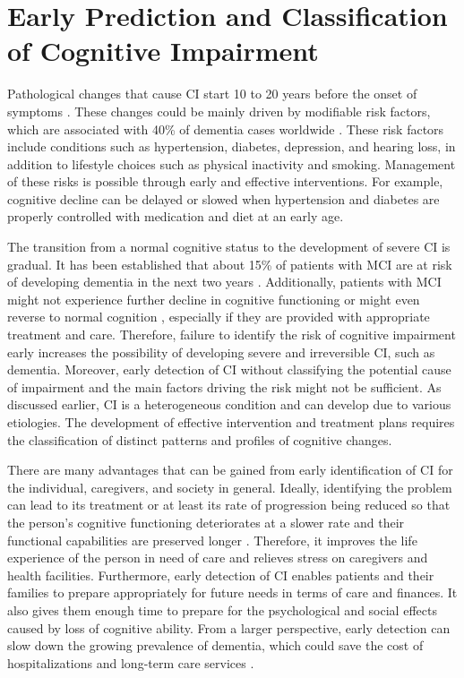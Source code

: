 \section{Early Prediction and Classification of Cognitive Impairment}
Pathological changes that cause CI start 10 to 20 years before the onset of symptoms \cite{Beason-Held2013Changes}. These changes could be mainly driven by modifiable risk factors, which are associated with 40\% of dementia cases worldwide \cite{Livingston2020Dementia}. These risk factors include conditions such as hypertension, diabetes, depression, and hearing loss, in addition to lifestyle choices such as physical inactivity and smoking. Management of these risks is possible through early and effective interventions. For example, cognitive decline can be delayed or slowed when hypertension and diabetes are properly controlled with medication and diet at an early age.

The transition from a normal cognitive status to the development of severe CI is gradual. It has been established that about 15\% of patients with MCI are at risk of developing dementia in the next two years \cite{Alzheimer2024}. Additionally, patients with MCI might not experience further decline in cognitive functioning or might even reverse to normal cognition \cite{Alzheimer2024}, especially if they are provided with appropriate treatment and care. Therefore, failure to identify the risk of cognitive impairment early increases the possibility of developing severe and irreversible CI, such as dementia. Moreover, early detection of CI without classifying the potential cause of impairment and the main factors driving the risk might not be sufficient. As discussed earlier, CI is a heterogeneous condition and can develop due to various etiologies. The development of effective intervention and treatment plans requires the classification of distinct patterns and profiles of cognitive changes.

There are many advantages that can be gained from early identification of CI for the individual, caregivers, and society in general. Ideally, identifying the problem can lead to its treatment or at least its rate of progression being reduced so that the person’s cognitive functioning deteriorates at a slower rate and their functional capabilities are preserved longer \cite{Mukadam2019Population}. Therefore, it improves the life experience of the person in need of care and relieves stress on caregivers and health facilities. Furthermore, early detection of CI enables patients and their families to prepare appropriately for future needs in terms of care and finances. It also gives them enough time to prepare for the psychological and social effects caused by loss of cognitive ability. From a larger perspective, early detection can slow down the growing prevalence of dementia, which could save the cost of hospitalizations and long-term care services \cite{Mukadam2019Population}.

